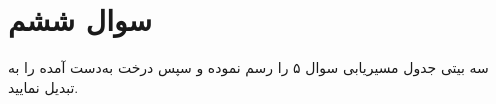 \section{سوال ششم}

 سه بیتی جدول مسیریابی سوال ۵ را رسم نموده و سپس درخت به‌دست آمده را به  تبدیل نمایید.


\begin{qsolve}
	
\end{qsolve}